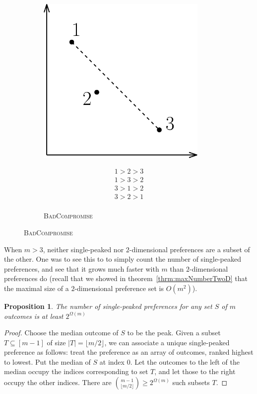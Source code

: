 \documentclass[12pt]{article}
\newtheorem{proposition}[theorem]{Proposition}
\newcommand{\1}[1]{\mathds{1}[{#1}]}
\begin{document}
\begin{figure}[h]
\begin{subfigure}[t]{0.45\textwidth}
\begin{minipage}{0.55\textwidth}
        \includegraphics[width=0.9\textwidth]{figures/exBadComp}
      \end{minipage}\hfill
      \begin{minipage}{0.45\textwidth}
        \begin{align*}
          1 > 2 > 3 \\
          1 > 3 > 2 \\
          3 > 1 > 2 \\
          3 > 2 > 1 \\
        \end{align*}
      \end{minipage}
      \caption{\textsc{BadCompromise}}
      \label{fig:gull}
    \end{subfigure}
  \end{figure}

  When $m>3$, neither single-peaked nor $2$-dimensional preferences
  are a subset of the other. One was to see this to to simply
  count the number of single-peaked preferences, and see that it
  grows much faster with $m$ than $2$-dimensional preferences do
  (recall that we showed in theorem~\ref{thrm:maxNumberTwoD}
  that the maximal size of a $2$-dimensional
  preference set is $O(m^2)$).
  \begin{proposition}
    The number of single-peaked preferences for any set $S$ of $m$ outcomes
    is at least $2^{\Omega(m)}$
  \end{proposition}
  \begin{proof}
    Choose the median outcome of $S$ to be the peak.
    Given a subset $T\subseteq [m-1]$ of size $|T| = \lfloor m/2\rfloor$,
    we can associate a
    unique single-peaked preference as follows:
    treat the preference as an array of outcomes, ranked highest to lowest.
    Put the median of $S$ at index $0$.
    Let the outcomes to the left of the median occupy the indices corresponding
    to set $T$, and let those to the right occupy the other indices.
    There are ${m-1 \choose \lfloor m/2\rfloor } \ge 2^{\Omega(m)}$ such
    subsets $T$.
  \end{proof}
\end{document}
